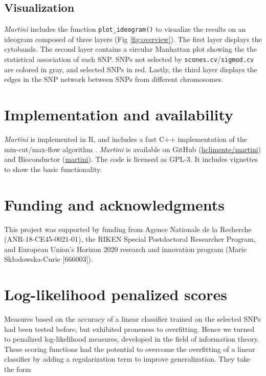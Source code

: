 \documentclass[a4paper]{article}
\begin{document}
    \subsection{Visualization}
    
    \emph{Martini} includes the function \texttt{plot\_ideogram()} to visualize the results on an ideogram composed of three layers (Fig \ref{fig:overview}). The first layer displays the cytobands. The second layer contains a circular Manhattan plot showing the the statistical association of each SNP. SNPs not selected by \texttt{scones.cv}/\texttt{sigmod.cv} are colored in gray, and selected SNPs in red. Lastly, the third layer displays the edges in the SNP network between SNPs from different chromosomes.
    
    \section{Implementation and availability}
    
    \emph{Martini} is implemented in R, and includes a fast C++ implementation of the min-cut/max-flow algorithm  \cite{boykovExperimentalComparisonMincut2004}. \emph{Martini} is available on GitHub (\href{https://github.com/hclimente/martini}{hclimente/martini}) and Bioconductor (\href{https://www.bioconductor.org/packages/release/bioc/html/martini.html}{martini}). The code is licensed as GPL-3. It includes vignettes to show the basic functionality.
    
    \section*{Funding and acknowledgments}

    This project was supported by funding from Agence Nationale de la Recherche (ANR-18-CE45-0021-01), the RIKEN Special Postdoctoral Researcher Program, and European Union’s Horizon 2020 research and innovation program (Marie Skłodowska-Curie [666003]). 

    
    
    \newpage
    \appendix

    \section{Log-likelihood penalized scores}
    \label{app:llp_scores}
    
    Measures based on the accuracy of a linear classifier trained on the selected SNPs had been tested before, but exhibited proneness to overfitting. Hence we turned to penalized log-likelihood measures, developed in the field of information theory. These scoring functions had the potential to overcome the overfitting of a linear classifier by adding a regularization term to improve generalization. They take the form
    
\end{document}
